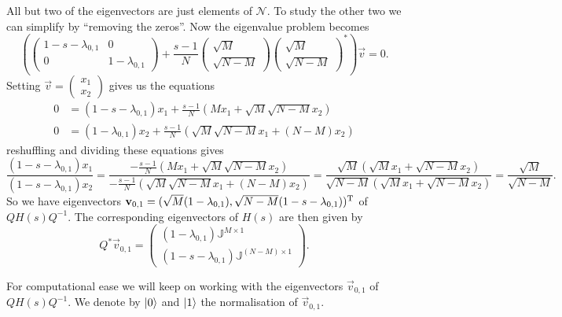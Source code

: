 All but two of the eigenvectors are just elements of $\mathcal{N}$. To study the other two we can simplify by ``removing the zeros''. Now the eigenvalue problem becomes
\[ \left(\begin{pmatrix}
1-s-\lambda_{0,1} & 0 \\ 0 & 1 -\lambda_{0,1}
\end{pmatrix} + \frac{s-1}{N}\begin{pmatrix}
\sqrt{M} \\ \sqrt{N-M}
\end{pmatrix}\begin{pmatrix}
\sqrt{M} \\ \sqrt{N-M}
\end{pmatrix}^*\right)\vec{v} = 0. \]
Setting $\vec{v} = \begin{pmatrix}
x_1 \\ x_2
\end{pmatrix}$ gives us the equations
\begin{align*}
0 &= (1-s-\lambda_{0,1})x_1 + \frac{s-1}{N}(Mx_1 + \sqrt{M}\sqrt{N-M}x_2) \\
0 &= (1-\lambda_{0,1})x_2 + \frac{s-1}{N}(\sqrt{M}\sqrt{N-M}x_1 + (N-M)x_2)
\end{align*}
reshuffling and dividing these equations gives
\[ \frac{(1-s-\lambda_{0,1})x_1}{(1-s-\lambda_{0,1})x_2} = \frac{-\frac{s-1}{N}(Mx_1 + \sqrt{M}\sqrt{N-M}x_2)}{-\frac{s-1}{N}(\sqrt{M}\sqrt{N-M}x_1 + (N-M)x_2)} = \frac{\sqrt{M}(\sqrt{M}x_1 + \sqrt{N-M}x_2)}{\sqrt{N-M}(\sqrt{M}x_1 + \sqrt{N-M}x_2)} = \frac{\sqrt{M}}{\sqrt{N-M}}. \]
So we have eigenvectors $\boldsymbol{\mathrm{v}}_{0,1} = (\sqrt{M}(1-\lambda_{0,1}), \sqrt{N-M}(1-s-\lambda_{0,1}))^{\mathrm{T}}$ of $QH(s)Q^{-1}$. The corresponding eigenvectors of $H(s)$ are then given by
\[ Q^*\vec{v}_{0,1} = \begin{pmatrix}
(1-\lambda_{0,1})\mathbb{J}^{M\times 1} \\ (1-s-\lambda_{0,1})\mathbb{J}^{(N-M)\times 1}
\end{pmatrix}. \]

For computational ease we will keep on working with the eigenvectors $\vec{v}_{0,1}$ of $QH(s)Q^{-1}$. We denote by $\left| 0 \right\rangle$ and $\left| 1 \right\rangle$ the normalisation of $\vec{v}_{0,1}$.


